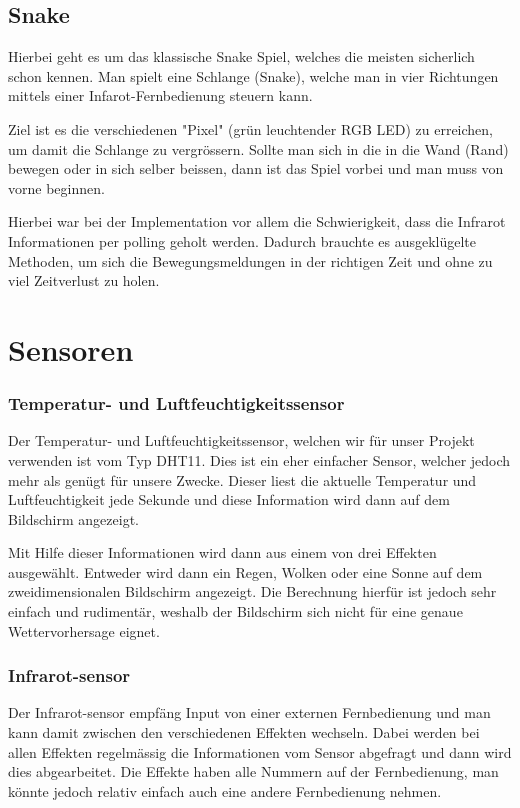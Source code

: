 \documentclass[12pt,a4paper]{article}
\begin{document}
\subsection{Snake}

Hierbei geht es um das klassische Snake Spiel, welches die meisten sicherlich schon kennen\cite{snake}.
Man spielt eine Schlange (Snake), welche man in vier Richtungen mittels einer Infarot-Fernbedienung steuern kann.

Ziel ist es die verschiedenen "Pixel" (grün leuchtender RGB LED) zu erreichen, um damit die Schlange zu vergrössern. Sollte man sich in die in die Wand (Rand) bewegen oder in sich selber beissen, dann ist das Spiel vorbei und man muss von vorne beginnen.

Hierbei war bei der Implementation vor allem die Schwierigkeit, dass die Infrarot Informationen per polling geholt werden. Dadurch brauchte es ausgeklügelte Methoden, um sich die Bewegungsmeldungen in der richtigen Zeit und ohne zu viel Zeitverlust zu holen.

\section{Sensoren}

\subsubsection{Temperatur- und Luftfeuchtigkeitssensor}

Der Temperatur- und Luftfeuchtigkeitssensor, welchen wir für unser Projekt verwenden ist vom Typ DHT11. Dies ist ein eher einfacher Sensor, welcher jedoch mehr als genügt für unsere Zwecke. Dieser liest die aktuelle Temperatur und Luftfeuchtigkeit jede Sekunde und diese Information wird dann auf dem Bildschirm angezeigt. 

Mit Hilfe dieser Informationen wird dann aus einem von drei Effekten ausgewählt. Entweder wird dann ein Regen, Wolken oder eine Sonne auf dem zweidimensionalen Bildschirm angezeigt. Die Berechnung hierfür ist jedoch sehr einfach und rudimentär, weshalb der Bildschirm sich nicht für eine genaue Wettervorhersage eignet. 

\subsubsection{Infrarot-sensor}

Der Infrarot-sensor empfäng Input von einer externen Fernbedienung und man kann damit zwischen den verschiedenen Effekten wechseln. Dabei werden bei allen Effekten regelmässig die Informationen vom Sensor abgefragt und dann wird dies abgearbeitet. Die Effekte haben alle Nummern auf der Fernbedienung, man könnte jedoch relativ einfach auch eine andere Fernbedienung nehmen.
\end{document}
